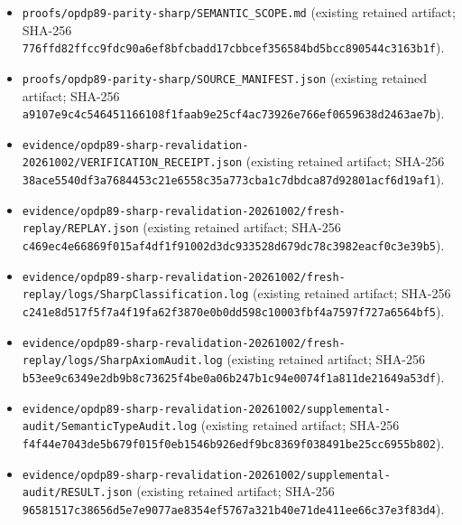 \documentclass[11pt,a4paper]{article}
\begin{document}
\begin{itemize}
\item \texttt{proofs/opdp89-parity-sharp/SEMANTIC\_SCOPE.md} (existing retained artifact; SHA-256 \texttt{776ffd82ffcc9fdc90a6ef8bfcbadd17cbbcef356584bd5bcc890544c3163b1f}).
\end{itemize}
\begin{itemize}
\item \texttt{proofs/opdp89-parity-sharp/SOURCE\_MANIFEST.json} (existing retained artifact; SHA-256 \texttt{a9107e9c4c546451166108f1faab9e25cf4ac73926e766ef0659638d2463ae7b}).
\end{itemize}
\begin{itemize}
\item \texttt{evidence/opdp89-sharp-revalidation-20261002/VERIFICATION\_RECEIPT.json} (existing retained artifact; SHA-256 \texttt{38ace5540df3a7684453c21e6558c35a773cba1c7dbdca87d92801acf6d19af1}).
\end{itemize}
\begin{itemize}
\item \texttt{evidence/opdp89-sharp-revalidation-20261002/fresh-replay/REPLAY.json} (existing retained artifact; SHA-256 \texttt{c469ec4e66869f015af4df1f91002d3dc933528d679dc78c3982eacf0c3e39b5}).
\end{itemize}
\begin{itemize}
\item \texttt{evidence/opdp89-sharp-revalidation-20261002/fresh-replay/logs/SharpClassification.log} (existing retained artifact; SHA-256 \texttt{c241e8d517f5f7a4f19fa62f3870e0b0dd598c10003fbf4a7597f727a6564bf5}).
\end{itemize}
\begin{itemize}
\item \texttt{evidence/opdp89-sharp-revalidation-20261002/fresh-replay/logs/SharpAxiomAudit.log} (existing retained artifact; SHA-256 \texttt{b53ee9c6349e2db9b8c73625f4be0a06b247b1c94e0074f1a811de21649a53df}).
\end{itemize}
\begin{itemize}
\item \texttt{evidence/opdp89-sharp-revalidation-20261002/supplemental-audit/SemanticTypeAudit.log} (existing retained artifact; SHA-256 \texttt{f4f44e7043de5b679f015f0eb1546b926edf9bc8369f038491be25cc6955b802}).
\end{itemize}
\begin{itemize}
\item \texttt{evidence/opdp89-sharp-revalidation-20261002/supplemental-audit/RESULT.json} (existing retained artifact; SHA-256 \texttt{96581517c38656d5e7e9077ae8354ef5767a321b40e71de411ee66c37e3f83d4}).
\end{itemize}
\end{document}
